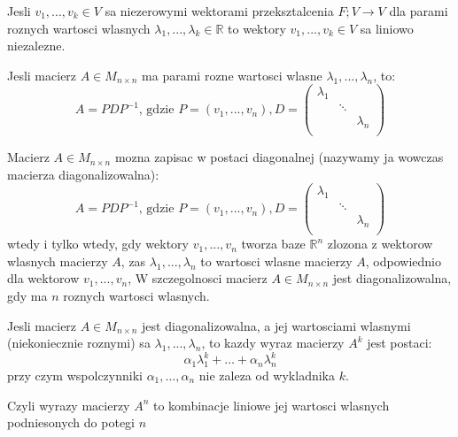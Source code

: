 \documentclass{article}
\begin{document}
\begin{tcolorbox}[colback=white!90!green,colframe=black!35!green,title=Fakt 3.6. Liniowo niezalezne wektory wlasne v1]

Jesli $v_{1},..., v_{k} \in V$ sa niezerowymi wektorami przeksztalcenia $F; V \rightarrow V$ dla parami roznych wartosci wlasnych $ {\lambda}_{1},..., {\lambda}_{k} \in \mathbb{R}$ to wektory $v_{1},..., v_{k} \in V$ sa liniowo niezalezne. 
 
\end{tcolorbox}


\begin{tcolorbox}[colback=white!90!blue,colframe=black!35!blue,title=Twierdzenie 3.7: Twierdzenie o diagonalizacji macierzy v1]

Jesli macierz $A \in M_{n \times n}$ ma parami rozne wartosci wlasne ${\lambda}_{1},..., {\lambda}_{n}$, to:
$$
A = PDP^{-1} \text{, gdzie } P = (v_{1},...,v_{n}),  
D = \begin{pmatrix}
{\lambda}_{1} & & \\
& \ddots & \\
& & {\lambda}_{n} \\  
\end{pmatrix}
$$
\end{tcolorbox}

\begin{tcolorbox}[colback=white!90!blue,colframe=black!35!blue,title=Twierdzenie 3.8: Twierdzenie o diagonalizacji macierzy v2]

Macierz $A \in M_{n \times n}$ mozna zapisac w postaci diagonalnej (nazywamy ja wowczas macierza diagonalizowalna):
$$
A = PDP^{-1} \text{, gdzie } P = (v_{1},...,v_{n}),
D = \begin{pmatrix}
{\lambda}_{1} & & \\
& \ddots & \\
& & {\lambda}_{n} \\  
\end{pmatrix}
$$
wtedy i tylko wtedy, gdy wektory $v_{1},...,v_{n}$ tworza baze $\mathbb{R}^{n}$
zlozona z wektorow wlasnych macierzy $A$, zas ${\lambda}_{1},...,{\lambda}_{n}$
to wartosci wlasne macierzy $A$, odpowiednio dla wektorow $v_{1},...,v_{n}$, W szczegolnosci macierz $A \in M_{n \times n}$ jest diagonalizowalna, gdy ma $n$ roznych wartosci wlasnych. 
\end{tcolorbox}

\begin{tcolorbox}[colback=white!90!green,colframe=black!35!green,title=Fakt 3.10 Potegowanie macierzy]

Jesli macierz $A \in M_{n \times n}$ jest diagonalizowalna, a jej wartosciami wlasnymi (niekoniecznie roznymi) sa ${\lambda}_{1},...,{\lambda}_{n}$, to kazdy wyraz macierzy $A^{k}$ jest postaci:
$${\alpha}_{1}{\lambda}^{k}_{1}+ \dots + {\alpha}_{n}{\lambda}^{k}_{n}$$
przy czym wspolczynniki ${\alpha}_{1}, \dots , {\alpha}_{n}$ nie zaleza od wykladnika $k$.

Czyli wyrazy macierzy $A^{n}$ to kombinacje liniowe jej wartosci wlasnych podniesonych do potegi $n$

\end{tcolorbox}
\end{document}
